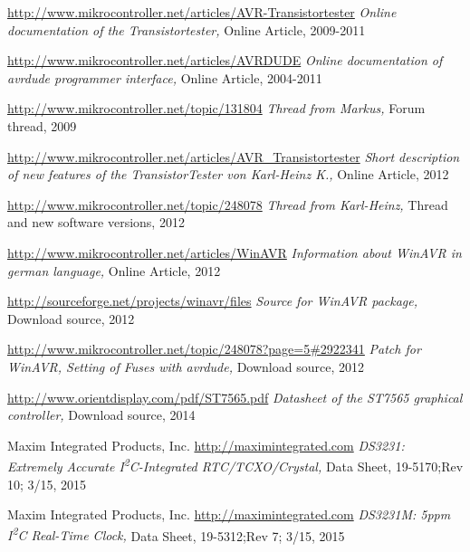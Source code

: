 \documentclass[pdftex,12pt,a4paper,oneside,english]{report}
\begin{document}
\begin{thebibliography}{99}
\url{http://www.mikrocontroller.net/articles/AVR-Transistortester}
\emph{Online documentation of the Transistortester,}
Online Article,
2009-2011

\url{http://www.mikrocontroller.net/articles/AVRDUDE}
\emph{Online documentation of avrdude programmer interface,}
Online Article,
2004-2011

\url{http://www.mikrocontroller.net/topic/131804}
\emph{Thread from Markus,}
Forum thread, 
2009

\url{http://www.mikrocontroller.net/articles/AVR\_Transistortester}
\emph{Short description of new features of the TransistorTester von Karl-Heinz K.,}
Online Article,
2012

\url{http://www.mikrocontroller.net/topic/248078}
\emph{Thread from Karl-Heinz,}
Thread and new software versions,
2012

\url{http://www.mikrocontroller.net/articles/WinAVR}
\emph{Information about WinAVR in german language,}
Online Article,
2012

\url{http://sourceforge.net/projects/winavr/files}
\emph{Source for WinAVR package,}
Download source,
2012

\url{http://www.mikrocontroller.net/topic/248078?page=5#2922341}
\emph{Patch for WinAVR, Setting of Fuses with avrdude,}
Download source,
2012

\url{http://www.orientdisplay.com/pdf/ST7565.pdf}
\emph{Datasheet of the ST7565 graphical controller,}
Download source,
2014

Maxim Integrated Products, Inc.
\url{http://maximintegrated.com}
\emph{DS3231: Extremely Accurate I\textsuperscript{2}C-Integrated RTC/TCXO/Crystal,}
Data Sheet,
19-5170;Rev 10; 3/15,
2015

Maxim Integrated Products, Inc.
\url{http://maximintegrated.com}
\emph{DS3231M: 5ppm I\textsuperscript{2}C Real-Time Clock,}
Data Sheet,
19-5312;Rev 7; 3/15,
2015



\end{thebibliography}
\end{document}
